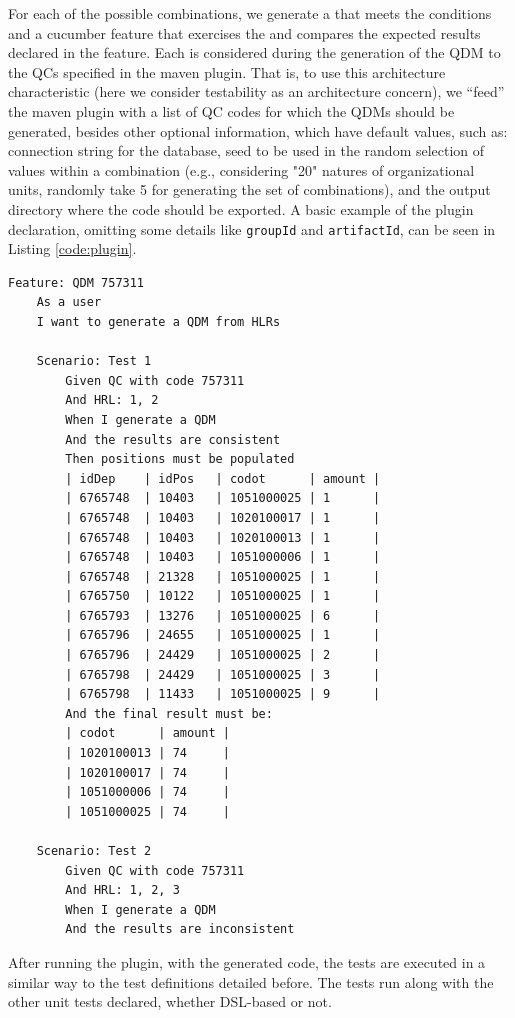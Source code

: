 For each of the possible combinations, we generate a \shc that meets the conditions 
and a cucumber feature that exercises the \shc and compares the expected results declared in the feature. 
Each \shc is considered during the generation of the QDM to the QCs specified in the 
maven plugin. That is, to use this architecture characteristic (here we consider testability as an 
architecture concern), we ``feed'' the maven plugin with a list of QC codes for which the QDMs should be generated, 
besides other optional information, which have default values, such as: connection string for the database, 
seed to be used in the random selection of values within a combination (e.g., considering "20" natures of 
organizational units, randomly take 5 for generating the set of combinations), and the output directory 
where the code should be exported. A basic example of the plugin declaration, omitting some details like 
\texttt{groupId} and \texttt{artifactId}, can be seen in Listing \ref{code:plugin}.

\begin{lstlisting}[frame=single, language=Cucumber, caption={\it Cucumber feature}, label={code:cucumber}]
Feature: QDM 757311
	As a user
	I want to generate a QDM from HLRs

	Scenario: Test 1
		Given QC with code 757311
		And HRL: 1, 2
		When I generate a QDM
		And the results are consistent
		Then positions must be populated
		| idDep    | idPos   | codot      | amount |
		| 6765748  | 10403   | 1051000025 | 1      |
		| 6765748  | 10403   | 1020100017 | 1      |
		| 6765748  | 10403   | 1020100013 | 1      |
		| 6765748  | 10403   | 1051000006 | 1      |
		| 6765748  | 21328   | 1051000025 | 1      |
		| 6765750  | 10122   | 1051000025 | 1      |    
		| 6765793  | 13276   | 1051000025 | 6      |
		| 6765796  | 24655   | 1051000025 | 1      |
		| 6765796  | 24429   | 1051000025 | 2      |
		| 6765798  | 24429   | 1051000025 | 3      |
		| 6765798  | 11433   | 1051000025 | 9      |   
		And the final result must be:
		| codot      | amount |
		| 1020100013 | 74     |
		| 1020100017 | 74     |
		| 1051000006 | 74     |
		| 1051000025 | 74     |

	Scenario: Test 2
		Given QC with code 757311
		And HRL: 1, 2, 3
		When I generate a QDM
		And the results are inconsistent    
\end{lstlisting}



After running the plugin, with the generated code, the tests are executed in a similar way to the test 
definitions detailed before. The tests run along with the other unit tests declared, 
whether DSL-based or not.
